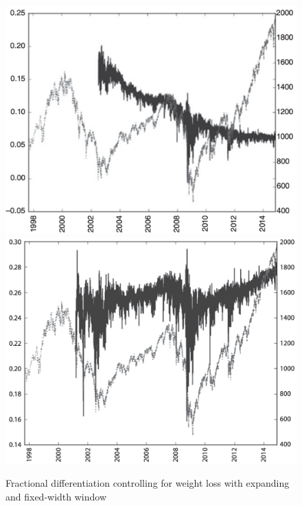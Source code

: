 \begin{figure}[H]
\centering
\includegraphics[scale=0.35]{figures/intro/fracdiffexpandwindow}
\includegraphics[scale=0.385]{figures/intro/fracdifffixedwidthwind}
\caption{Fractional differentiation controlling for weight loss with expanding and fixed-width window}
\end{figure}


